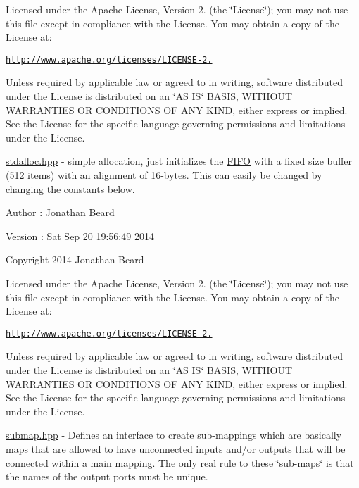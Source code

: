 Licensed under the Apache License, Version 2. (the \char`\"{}\+License\char`\"{}); you may not use this file except in compliance with the License. You may obtain a copy of the License at\+:

\href{http://www.apache.org/licenses/LICENSE-2.0}{\tt http\+://www.\+apache.\+org/licenses/\+L\+I\+C\+E\+N\+S\+E-\/2.}

Unless required by applicable law or agreed to in writing, software distributed under the License is distributed on an \char`\"{}\+A\+S I\+S\char`\"{} B\+A\+S\+IS, W\+I\+T\+H\+O\+UT W\+A\+R\+R\+A\+N\+T\+I\+ES OR C\+O\+N\+D\+I\+T\+I\+O\+NS OF A\+NY K\+I\+ND, either express or implied. See the License for the specific language governing permissions and limitations under the License.

\hyperlink{stdalloc_8hpp_source}{stdalloc.\+hpp} -\/ simple allocation, just initializes the \hyperlink{class_f_i_f_o}{F\+I\+FO} with a fixed size buffer (512 items) with an alignment of 16-\/bytes. This can easily be changed by changing the constants below. \begin{DoxyAuthor}{Author}
\+: Jonathan Beard 
\end{DoxyAuthor}
\begin{DoxyVersion}{Version}
\+: Sat Sep 20 19\+:56\+:49 2014
\end{DoxyVersion}
Copyright 2014 Jonathan Beard

Licensed under the Apache License, Version 2. (the \char`\"{}\+License\char`\"{}); you may not use this file except in compliance with the License. You may obtain a copy of the License at\+:

\href{http://www.apache.org/licenses/LICENSE-2.0}{\tt http\+://www.\+apache.\+org/licenses/\+L\+I\+C\+E\+N\+S\+E-\/2.}

Unless required by applicable law or agreed to in writing, software distributed under the License is distributed on an \char`\"{}\+A\+S I\+S\char`\"{} B\+A\+S\+IS, W\+I\+T\+H\+O\+UT W\+A\+R\+R\+A\+N\+T\+I\+ES OR C\+O\+N\+D\+I\+T\+I\+O\+NS OF A\+NY K\+I\+ND, either express or implied. See the License for the specific language governing permissions and limitations under the License.

\hyperlink{submap_8hpp_source}{submap.\+hpp} -\/ Defines an interface to create sub-\/mappings which are basically maps that are allowed to have unconnected inputs and/or outputs that will be connected within a main mapping. The only real rule to these \char`\"{}sub-\/maps\char`\"{} is that the names of the output ports must be unique.


